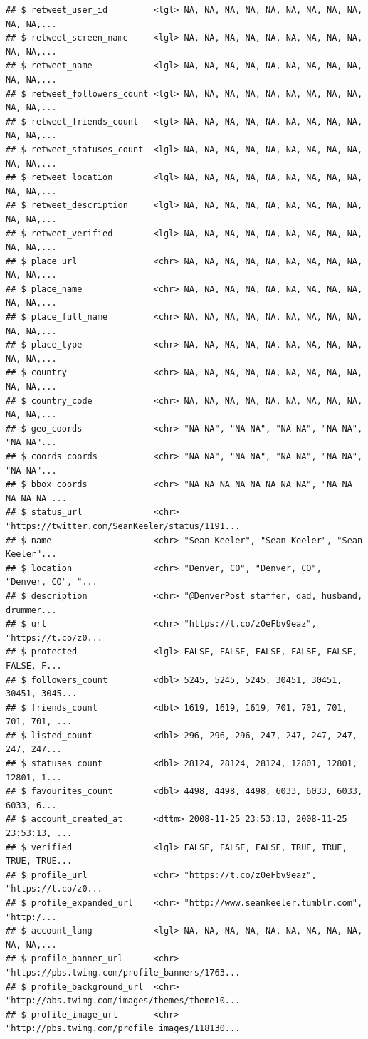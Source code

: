 \documentclass[]{book}
\begin{document}
\begin{verbatim}
## $ retweet_user_id         <lgl> NA, NA, NA, NA, NA, NA, NA, NA, NA, NA, NA,...
## $ retweet_screen_name     <lgl> NA, NA, NA, NA, NA, NA, NA, NA, NA, NA, NA,...
## $ retweet_name            <lgl> NA, NA, NA, NA, NA, NA, NA, NA, NA, NA, NA,...
## $ retweet_followers_count <lgl> NA, NA, NA, NA, NA, NA, NA, NA, NA, NA, NA,...
## $ retweet_friends_count   <lgl> NA, NA, NA, NA, NA, NA, NA, NA, NA, NA, NA,...
## $ retweet_statuses_count  <lgl> NA, NA, NA, NA, NA, NA, NA, NA, NA, NA, NA,...
## $ retweet_location        <lgl> NA, NA, NA, NA, NA, NA, NA, NA, NA, NA, NA,...
## $ retweet_description     <lgl> NA, NA, NA, NA, NA, NA, NA, NA, NA, NA, NA,...
## $ retweet_verified        <lgl> NA, NA, NA, NA, NA, NA, NA, NA, NA, NA, NA,...
## $ place_url               <chr> NA, NA, NA, NA, NA, NA, NA, NA, NA, NA, NA,...
## $ place_name              <chr> NA, NA, NA, NA, NA, NA, NA, NA, NA, NA, NA,...
## $ place_full_name         <chr> NA, NA, NA, NA, NA, NA, NA, NA, NA, NA, NA,...
## $ place_type              <chr> NA, NA, NA, NA, NA, NA, NA, NA, NA, NA, NA,...
## $ country                 <chr> NA, NA, NA, NA, NA, NA, NA, NA, NA, NA, NA,...
## $ country_code            <chr> NA, NA, NA, NA, NA, NA, NA, NA, NA, NA, NA,...
## $ geo_coords              <chr> "NA NA", "NA NA", "NA NA", "NA NA", "NA NA"...
## $ coords_coords           <chr> "NA NA", "NA NA", "NA NA", "NA NA", "NA NA"...
## $ bbox_coords             <chr> "NA NA NA NA NA NA NA NA", "NA NA NA NA NA ...
## $ status_url              <chr> "https://twitter.com/SeanKeeler/status/1191...
## $ name                    <chr> "Sean Keeler", "Sean Keeler", "Sean Keeler"...
## $ location                <chr> "Denver, CO", "Denver, CO", "Denver, CO", "...
## $ description             <chr> "@DenverPost staffer, dad, husband, drummer...
## $ url                     <chr> "https://t.co/z0eFbv9eaz", "https://t.co/z0...
## $ protected               <lgl> FALSE, FALSE, FALSE, FALSE, FALSE, FALSE, F...
## $ followers_count         <dbl> 5245, 5245, 5245, 30451, 30451, 30451, 3045...
## $ friends_count           <dbl> 1619, 1619, 1619, 701, 701, 701, 701, 701, ...
## $ listed_count            <dbl> 296, 296, 296, 247, 247, 247, 247, 247, 247...
## $ statuses_count          <dbl> 28124, 28124, 28124, 12801, 12801, 12801, 1...
## $ favourites_count        <dbl> 4498, 4498, 4498, 6033, 6033, 6033, 6033, 6...
## $ account_created_at      <dttm> 2008-11-25 23:53:13, 2008-11-25 23:53:13, ...
## $ verified                <lgl> FALSE, FALSE, FALSE, TRUE, TRUE, TRUE, TRUE...
## $ profile_url             <chr> "https://t.co/z0eFbv9eaz", "https://t.co/z0...
## $ profile_expanded_url    <chr> "http://www.seankeeler.tumblr.com", "http:/...
## $ account_lang            <lgl> NA, NA, NA, NA, NA, NA, NA, NA, NA, NA, NA,...
## $ profile_banner_url      <chr> "https://pbs.twimg.com/profile_banners/1763...
## $ profile_background_url  <chr> "http://abs.twimg.com/images/themes/theme10...
## $ profile_image_url       <chr> "http://pbs.twimg.com/profile_images/118130...
\end{verbatim}
\end{document}
